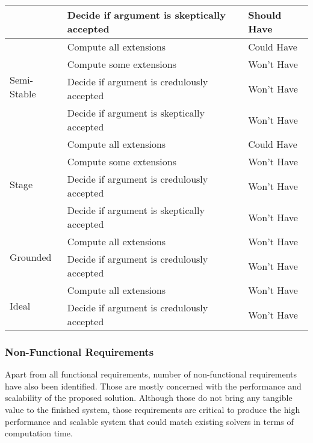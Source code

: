 \begin{table}[]
\begin{tabular}{|l|l|l|}
		& Decide if argument is skeptically accepted & Should Have     \\ \hline
		\multirow{4}{*}{Semi-Stable} & Compute all extensions                           & Could Have      \\ \cline{2-3} 
		& Compute some extensions                          & Won't Have      \\ \cline{2-3} 
		& Decide if argument is credulously accepted & Won't Have      \\ \cline{2-3} 
		& Decide if argument is skeptically accepted & Won't Have      \\ \hline
		\multirow{4}{*}{Stage}       & Compute all extensions                           & Could Have      \\ \cline{2-3} 
		& Compute some extensions                          & Won't Have      \\ \cline{2-3} 
		& Decide if argument is credulously accepted & Won't Have      \\ \cline{2-3} 
		& Decide if argument is skeptically accepted & Won't Have      \\ \hline
		\multirow{2}{*}{Grounded}    & Compute all extensions                           & Won't Have      \\ \cline{2-3} 
		& Decide if argument is credulously accepted & Won't Have      \\ \hline
		\multirow{2}{*}{Ideal}       & Compute all extensions                           & Won't Have      \\ \cline{2-3} 
		& Decide if argument is credulously accepted & Won't Have      \\ \hline
	\end{tabular}
\end{table}

\subsubsection{Non-Functional Requirements}
Apart from all functional requirements, number of non-functional requirements have also been identified. Those are mostly concerned with the performance and scalability of the proposed solution. Although those do not bring any tangible value to the finished system, those requirements are critical to produce the high performance and scalable system that could match existing solvers in terms of computation time. 